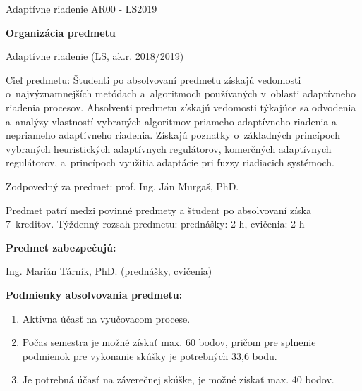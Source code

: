 \documentclass[a4paper, 10pt, ]{article}
\def\oznacenieCasti{AR00 - LS2019}
\begin{document}
\fontsize{12pt}{22pt}\selectfont

\centerline{\textsf{Adaptívne riadenie} \hfill \textsf{\oznacenieCasti}}

\fontsize{18pt}{22pt}\selectfont





\begin{flushleft}
	\textbf{\textsf{Organizácia predmetu}}
\end{flushleft}





\normalsize

\bigskip



\noindent
Adaptívne riadenie (LS, ak.r. 2018/2019)

\medskip

\noindent
Cieľ predmetu: \newline
Študenti po absolvovaní predmetu získajú vedomosti o~najvýznamnejších metódach a~algoritmoch používaných v~oblasti adaptívneho riadenia procesov. Absolventi predmetu získajú vedomosti týkajúce sa odvodenia a~analýzy vlastností vybraných algoritmov priameho adaptívneho riadenia a nepriameho adaptívneho riadenia. Získajú poznatky o~základných princípoch vybraných heuristických adaptívnych regulátorov, komerčných adaptívnych regulátorov, a~princípoch využitia adaptácie pri fuzzy riadiacich systémoch.

\medskip

\noindent
Zodpovedný za predmet: prof. Ing. Ján Murgaš, PhD.

\medskip

\noindent
Predmet patrí medzi povinné predmety a študent po absolvovaní získa 7~kreditov. Týždenný rozsah predmetu: prednášky: 2 h, cvičenia: 2 h

\bigskip

\noindent
\textbf{\textsf{Predmet zabezpečujú:}}

\medskip

\noindent
Ing. Marián Tárník, PhD. (prednášky, cvičenia)

\bigskip

\noindent
\textbf{\textsf{Podmienky absolvovania predmetu:}}

\noindent
\begin{enumerate}

	\item Aktívna účasť na vyučovacom procese.

	\item Počas semestra je možné získať max. 60 bodov, pričom pre splnenie podmienok pre vykonanie skúšky je potrebných 33,6 bodu.

	\item Je potrebná účasť na záverečnej skúške, je možné získať max. 40 bodov.

\end{enumerate}
\end{document}
